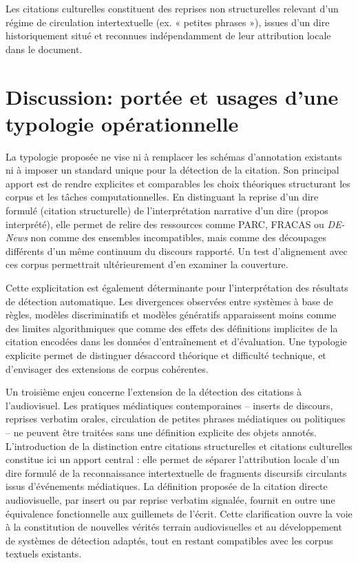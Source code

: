 \documentclass[final,fra]{anthology-ch}         %
\begin{document}
Les citations culturelles constituent des reprises non structurelles
relevant d'un régime de circulation intertextuelle (ex. « petites
phrases »), issues d'un dire historiquement situé et reconnues
indépendamment de leur attribution locale dans le document.

\section{Discussion: portée et usages d'une typologie opérationnelle}

La typologie proposée ne vise ni à remplacer les schémas d'annotation
existants ni à imposer un standard unique pour la détection de la
citation. Son principal apport est de rendre explicites et comparables
les choix théoriques structurant les corpus et les tâches
computationnelles. En distinguant la reprise d'un dire formulé (citation
structurelle) de l'interprétation narrative d'un dire (propos
interprété), elle permet de relire des ressources comme PARC, FRACAS ou
\textit{DE-News} non comme des ensembles incompatibles, mais comme des découpages
différents d'un même continuum du discours rapporté. Un test
d'alignement avec ces corpus permettrait ultérieurement d'en examiner la
couverture.

Cette explicitation est également déterminante pour l'interprétation des
résultats de détection automatique. Les divergences observées entre
systèmes à base de règles, modèles discriminatifs et modèles génératifs
apparaissent moins comme des limites algorithmiques que comme des effets
des définitions implicites de la citation encodées dans les données
d'entraînement et d'évaluation. Une typologie explicite permet de
distinguer désaccord théorique et difficulté technique, et d'envisager
des extensions de corpus cohérentes.

Un troisième enjeu concerne l'extension de la détection des citations à
l'audiovisuel. Les pratiques médiatiques contemporaines -- inserts de
discours, reprises verbatim orales, circulation de \og petites phrases\fg{}
médiatiques ou politiques -- ne peuvent être traitées sans une définition
explicite des objets annotés. L'introduction de la distinction entre
citations structurelles et citations culturelles constitue ici un apport
central : elle permet de séparer l'attribution locale d'un dire formulé
de la reconnaissance intertextuelle de fragments discursifs circulants
issus d'événements médiatiques. La définition proposée de la citation
directe audiovisuelle, par insert ou par reprise verbatim signalée,
fournit en outre une équivalence fonctionnelle aux guillemets de
l'écrit. Cette clarification ouvre la voie à la constitution de
nouvelles vérités terrain audiovisuelles et au développement de systèmes
de détection adaptés, tout en restant compatibles avec les corpus
textuels existants.
\end{document}
